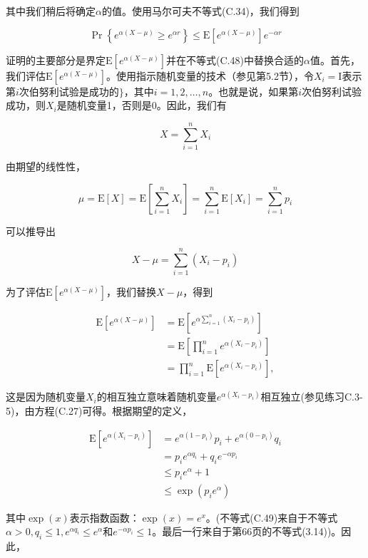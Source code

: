 \documentclass[lang=cn,newtx,10pt,scheme=chinese]{elegantbook}
\begin{document}
其中我们稍后将确定$\alpha$的值。使用马尔可夫不等式(C.34)，我们得到

$$
\operatorname{Pr}\left\{e^{\alpha(X-\mu)} \geq e^{\alpha r}\right\} \leq \mathrm{E}\left[e^{\alpha(X-\mu)}\right] e^{-\alpha r}
$$

证明的主要部分是界定$\mathrm{E}\left[e^{\alpha(X-\mu)}\right]$并在不等式(C.48)中替换合适的$\alpha$值。首先，我们评估$\mathrm{E}\left[e^{\alpha(X-\mu)}\right]$。使用指示随机变量的技术（参见第5.2节），令$X_i=\mathrm{I}$表示第$i$次伯努利试验是成功的$\}$，其中$i=1,2, \ldots, n$。也就是说，如果第$i$次伯努利试验成功，则$X_i$是随机变量1，否则是0。因此，我们有

$$
X=\sum_{i=1}^n X_i
$$

由期望的线性性，

$$
\mu=\mathrm{E}[X]=\mathrm{E}\left[\sum_{i=1}^n X_i\right]=\sum_{i=1}^n \mathrm{E}\left[X_i\right]=\sum_{i=1}^n p_i
$$

可以推导出

$$
X-\mu=\sum_{i=1}^n\left(X_i-p_i\right)
$$

为了评估$\mathrm{E}\left[e^{\alpha(X-\mu)}\right]$，我们替换$X-\mu$，得到

$$
\begin{aligned}
\mathrm{E}\left[e^{\alpha(X-\mu)}\right] & =\mathrm{E}\left[e^{\alpha \sum_{i=1}^n\left(X_i-p_i\right)}\right] \\
& =\mathrm{E}\left[\prod_{i=1}^n e^{\alpha\left(X_i-p_i\right)}\right] \\
& =\prod_{i=1}^n \mathrm{E}\left[e^{\alpha\left(X_i-p_i\right)}\right],
\end{aligned}
$$

这是因为随机变量$X_i$的相互独立意味着随机变量$e^{\alpha\left(X_i-p_i\right)}$相互独立(参见练习C.3-5)，由方程(C.27)可得。根据期望的定义，

$$
\begin{aligned}
\mathrm{E}\left[e^{\alpha\left(X_i-p_i\right)}\right] & =e^{\alpha\left(1-p_i\right)} p_i+e^{\alpha\left(0-p_i\right)} q_i \\
& =p_i e^{\alpha q_i}+q_i e^{-\alpha p_i} \\
& \leq p_i e^\alpha+1 \\
& \leq \exp \left(p_i e^\alpha\right)
\end{aligned}
$$

其中$\exp(x)$表示指数函数：$\exp(x)=e^x$。(不等式(C.49)来自于不等式$\alpha>0, q_i \leq 1, e^{\alpha q_i} \leq e^\alpha$和$e^{-\alpha p_i} \leq 1$。最后一行来自于第66页的不等式(3.14))。因此，
\end{document}

